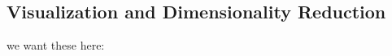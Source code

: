 \subsection{Visualization and Dimensionality Reduction} \label{sec:vis_dr}
we want these here: \citet{Correa2009-hi, Sacha2017-hf, Lyons2017-mh, Chipman2005-om, Venna2007-yj, Vellido2012-nm, Chadalavada2015-wx, Hutchins2015-if}
